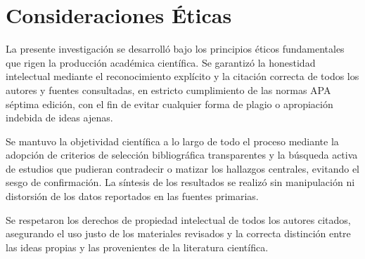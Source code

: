 \documentclass[12pt, a4paper]{article}
\begin{document}
\section{Consideraciones Éticas}

La presente investigación se desarrolló bajo los principios éticos fundamentales que rigen la
producción académica científica. Se garantizó la honestidad intelectual mediante el
reconocimiento explícito y la citación correcta de todos los autores y fuentes consultadas, en
estricto cumplimiento de las normas APA séptima edición, con el fin de evitar cualquier forma
de plagio o apropiación indebida de ideas ajenas.

Se mantuvo la objetividad científica a lo largo de todo el proceso mediante la adopción de
criterios de selección bibliográfica transparentes y la búsqueda activa de estudios que
pudieran contradecir o matizar los hallazgos centrales, evitando el sesgo de confirmación. La
síntesis de los resultados se realizó sin manipulación ni distorsión de los datos reportados en
las fuentes primarias.

Se respetaron los derechos de propiedad intelectual de todos los autores citados, asegurando el
uso justo de los materiales revisados y la correcta distinción entre las ideas propias y las
provenientes de la literatura científica.

\onecolumn
\printbibliography[title={Referencias Bibliográficas}]
\end{document}
